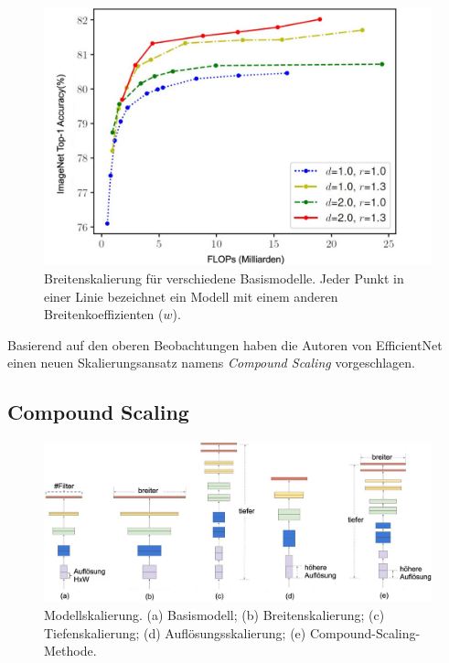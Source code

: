 \begin{figure}[!h]
	\centering
	\includegraphics[width=\linewidth]{images/ScalingWidthForDiffBaselineModels}
	\caption{Breitenskalierung für verschiedene Basismodelle. Jeder Punkt in einer Linie bezeichnet ein Modell mit einem anderen Breitenkoeffizienten ($w$). \protect\cite{tan2020efficientnet}}
	\label{fig:ScalingWidthForDiffBaselineModels}
\end{figure}

Basierend auf den oberen Beobachtungen haben die Autoren von EfficientNet einen neuen Skalierungsansatz namens \emph{Compound Scaling} vorgeschlagen.

\subsection{Compound Scaling}

\begin{figure}[H]
	\centering
	\includegraphics[width=\linewidth]{images/compoundScaling}
	\caption{Modellskalierung. (a) Basismodell; (b) Breitenskalierung; (c) Tiefenskalierung; (d) Auflösungsskalierung; (e) Compound-Scaling-Methode. \protect\cite{tan2020efficientnet}}
	\label{fig:compoundScaling}
\end{figure}

